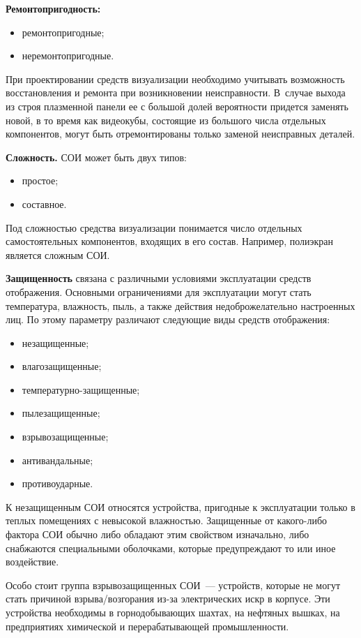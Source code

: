 \begin{multicols}{2}
\textbf{Ремонтопригодность:}

\noindent
\begin{itemize}
\item ремонтопригодные;
\item неремонтопригодные.
\end{itemize}

При проектировании средств визуализации необходимо учитывать 
возможность восстановления и ремонта при возникновении
неисправности. В~случае выхода из строя плазменной панели ее с большой 
долей вероятности придется заменять новой, в то время как видеокубы, 
состоящие из большого числа отдельных компонентов, могут быть 
отремонтированы только заменой неисправных деталей. 

\textbf{Сложность.} СОИ может быть двух типов:
\begin{itemize}
\item простое;
\item составное.
\end{itemize}
   
   Под сложностью средства визуализации понимается число отдельных 
самостоятельных компонентов, входящих в его состав. Например, полиэкран 
является сложным СОИ. 
   
\textbf{Защищенность} связана с различными условиями эксплуатации 
средств отоб\-ра\-же\-ния. Основными ограничениями для эксплуатации могут 
стать температура, влажность, пыль, а также действия недобро\-желательно 
настроенных лиц. По этому параметру различают следующие виды средств 
отоб\-ра\-жения:
\begin{itemize}
\item незащищенные;
\item влагозащищенные;
\item температурно-защищенные;
\item пылезащищенные;
\item взрывозащищенные;
\item антивандальные;
\item противоударные.
\end{itemize}
   
   К незащищенным СОИ относятся устройства, пригодные к эксплуатации 
только в теплых помещениях с невысокой влажностью. Защищенные от 
какого-либо фактора СОИ обычно либо обладают этим свойством 
изначально, либо снабжаются специальными оболочками, которые 
предупреждают то или иное воздействие. 
   
   Особо стоит группа взрывозащищенных СОИ~--- устройств, которые не 
могут стать причиной взрыва/возгорания из-за электрических искр в корпусе. 
Эти устройства необходимы в горнодобывающих шахтах, на нефтяных 
вышках, на предприятиях химической и перерабатывающей 
промышленности. 


\end{multicols}
